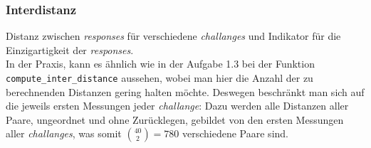 \subsubsection*{Interdistanz}
\begin{comment}
VL 5, Folie 36:
Distance between responses for different challenges. 
Indicates uniqueness of responses.

Doktorarbeit, S. 22:
A PUF response inter-distance is a random variable 
describing the distance between two PUF responses 
from different PUF instances using the same challenge:


Paper, S. 1132:
Inter-PUF variation: Defined as the number of bits
in a PUF response that vary between different
devices for a set of shared challenges. This is 
due to differences between the physical ICs and 
is also commonly represented in the form of a 
statistical distribution. The inter-PUF variation 
is a measure of the uniqueness of an individual 
PUF circuit
\end{comment}

Distanz zwischen \textit{responses} für verschiedene 
\textit{challanges} und Indikator für die Einzigartigkeit 
der \textit{responses}.\\

In der Praxis, kann es ähnlich wie in der Aufgabe 1.3 
bei der Funktion \verb|compute_inter_distance| 
aussehen, wobei man hier die Anzahl der
zu berechnenden Distanzen gering halten möchte.
Deswegen beschränkt man sich auf die jeweils ersten 
Messungen jeder \textit{challange}: Dazu werden alle 
Distanzen aller Paare, ungeordnet und ohne Zurücklegen, 
gebildet von den ersten Messungen aller 
\textit{challanges}, was somit 
\footnotesize $\binom{40}{2}=780$ \normalsize
verschiedene Paare sind. 

